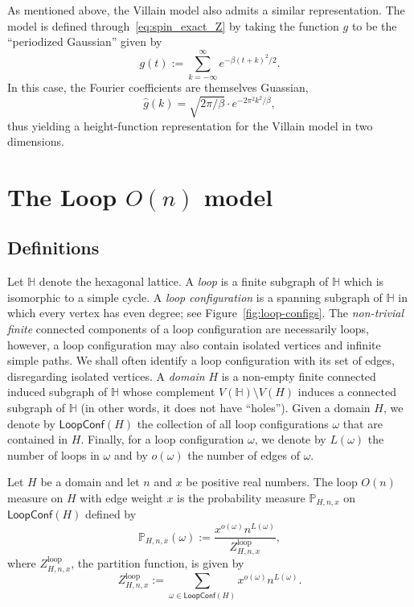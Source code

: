\documentclass[12pt,reqno]{article}
\renewcommand{\Pr}{\mathbb{P}}
\newcommand{\HH}{\mathbb{H}}
\newcommand{\LC}{\mathsf{LoopConf}}
\begin{document}
As mentioned above, the Villain model also admits a similar representation. The model is defined through~\eqref{eq:spin_exact_Z} by taking the function $g$ to be the ``periodized Gaussian'' given by
\[ g(t) := \sum_{k=-\infty}^\infty e^{-\beta (t+k)^2/2} .\]
In this case, the Fourier coefficients are themselves Guassian,
\[ \hat{g}(k) = \sqrt{2\pi/\beta} \cdot e^{-2 \pi^2 k^2 / \beta} ,\]
thus yielding a height-function representation for the Villain model in two dimensions.


\section{The Loop $O(n)$ model}
\label{sec:loop-model}

\subsection{Definitions}
\label{sec:loop-model-def}


Let $\HH$ denote the hexagonal lattice.
A \emph{loop} is a
finite subgraph of $\HH$ which is isomorphic to a simple cycle. A
\emph{loop configuration} is a spanning subgraph of $\HH$ in which
every vertex has even degree; see Figure~\ref{fig:loop-configs}. The
\emph{non-trivial finite} connected components of a loop
configuration are necessarily loops, however, a loop configuration
may also contain isolated vertices and infinite simple paths. We
shall often identify a loop configuration with its set of edges,
disregarding isolated vertices. A \emph{domain} $H$ is
a non-empty finite connected induced subgraph of $\HH$ whose
complement $V(\HH) \setminus V(H)$ induces a connected subgraph of
$\HH$ (in other words, it does not have ``holes''). Given a domain $H$, we
denote by $\LC(H)$ the collection of all loop configurations
$\omega$ that are contained in $H$. Finally,
for a loop configuration $\omega$, we denote by
$L(\omega)$ the number of loops in $\omega$ and by $o(\omega)$ the number of edges of $\omega$.


Let $H$ be a domain and let $n$ and $x$ be positive real numbers. The loop $O(n)$ measure on $H$ with edge
weight $x$ is the probability measure
$\Pr_{H,n,x}$ on $\LC(H)$ defined by
  \begin{equation}\label{eq:loop O n model def}
  \Pr_{H,n,x}(\omega) := \frac{x^{o(\omega)} n^{L(\omega)}}{Z_{H,n,x}^{\text{loop}}},
  \end{equation}
  where $Z_{H,n,x}^{\text{loop}}$, the partition function, is given by
  \[ Z_{H,n,x}^{\text{loop}} := \sum_{\omega \in \LC(H)} x^{o(\omega)} n^{L(\omega)} .\]
\end{document}
